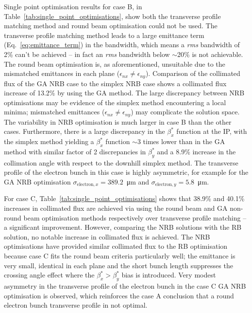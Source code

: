 \documentclass[../main.tex]{subfiles}
\begin{document}
Single point optimisation results for case B, in Table~\ref{tab:single_point_optimisations}, show both the transverse profile matching method and round beam optimisation could not be used. The transverse profile matching method leads to a large emittance term (Eq.~\ref{eq:emittance_term}) in the bandwidth, which means a \textit{rms} bandwidth of 2\% can't be achieved -- in fact an \textit{rms} bandwidth below $\sim$20\% is not achievable. The round beam optimisation is, as aforementioned, unsuitable due to the mismatched emittances in each plane ($\epsilon_{nx}\neq\epsilon_{ny}$). Comparison of the collimated flux of the GA NRB case to the simplex NRB case shows a collimated flux increase of 13.2\% by using the GA method. The large discrepancy between NRB optimisations may be evidence of the simplex method encountering a local minima; mismatched emittances ($\epsilon_{nx}\neq\epsilon_{ny}$) may complicate the solution space. The variability in NRB optimisation is much larger in case B than the other cases. Furthermore, there is a large discrepancy in the $\beta_{x}^{*}$ function at the IP, with the simplex method yielding a $\beta_{x}^{*}$ function $\sim3$ times lower than in the GA method with similar factor of 2 discrepancies in $\beta_{y}^{*}$ and a 8.9\% increase in the collimation angle with respect to the downhill simplex method. The transverse profile of the electron bunch in this case is highly asymmetric, for example for the GA NRB optimisation $\sigma_{\mathrm{electron},x} = 389.2$~\si{\micro\meter} and $\sigma_{\mathrm{electron},y} = 5.8$~\si{\micro\meter}.

For case C, Table~\ref{tab:single_point_optimisations} shows that 38.9\% and 40.1\% increases in collimated flux are achieved via using the round beam and GA non-round beam optimisation methods respectively over transverse profile matching -- a significant improvement. However, comparing the NRB solutions with the RB solution, no notable increase in collimated flux is achieved. The NRB optimisations have provided similar collimated flux to the RB optimisation because case C fits the round beam criteria particularly well; the emittance is very small, identical in each plane and the short bunch length suppresses the crossing angle effect where the $\beta_{x}^{*} > \beta_{y}^{*}$ bias is introduced. Very modest asymmetry in the transverse profile of the electron bunch in the case C GA NRB optimisation is observed, which reinforces the case A conclusion that a round electron bunch transverse profile in not optimal.      
\end{document}
